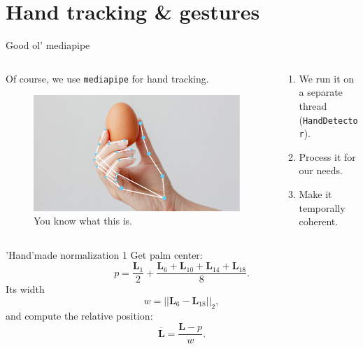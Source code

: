 \documentclass[english]{beamer}
\begin{document}
\section{Hand tracking \& gestures}
\begin{frame}{Good ol' mediapipe}
    \begin{columns}
        \begin{column}{.5\textwidth}
            Of course, we use \texttt{mediapipe} for hand tracking.
            \begin{figure}
                \centering
                \includegraphics[width=.9\textwidth]{images/hand_landmark.png}
                \caption{You know what this is.}
            \end{figure}
        \end{column}
        \begin{column}{.5\textwidth}
            \begin{enumerate}
                \item We run it on a separate thread (\texttt{HandDetector}).
                \item Process it for our needs.
                \item Make it temporally coherent.
            \end{enumerate}
        \end{column}
    \end{columns}
\end{frame}

\begin{frame}{'Hand'made normalization 1}
    Get palm center:
    \begin{equation}
        p = \frac{\mathbf{L}_1}{2} + \frac{\mathbf{L}_6 + \mathbf{L}_{10} + \mathbf{L}_{14} + \mathbf{L}_{18}}{8}.
    \end{equation}
    Its width
    \begin{equation}
        w = ||\mathbf{L}_6 - \mathbf{L}_{18}||_2,
    \end{equation}
    and compute the relative position:
    \begin{equation}
        \overline{\mathbf{L}} = \frac{\mathbf{L} - p}{w}.
    \end{equation}
\end{frame}
\end{document}
